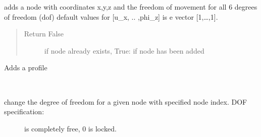 \documentclass[letterpaper,10pt,english]{sphinxmanual}
\begin{document}
\begin{fulllineitems}
\begin{fulllineitems}
\label{\detokenize{api:beamon.database.Database.add_node}}
adds a node with coordinates x,y,z and the freedom of movement for all 6 degrees of freedom (dof)
default values for {[}u\_x, .. ,phi\_z{]} is e vector {[}1,…,1{]}.
\begin{quote}\begin{description}
\item[{Return False}] \leavevmode
if node already exists, True: if node has been added

\end{description}\end{quote}

\end{fulllineitems}


\begin{fulllineitems}
\label{\detokenize{api:beamon.database.Database.add_profile}}
Adds a profile

\end{fulllineitems}


\begin{fulllineitems}
\label{\detokenize{api:beamon.database.Database.change_dof}}~\begin{description}
\item[{change the degree of freedom for a given node with specified node index. DOF specification:}]  is completely free, 0 is locked.


\end{description}
\end{fulllineitems}
\end{fulllineitems}
\end{document}

